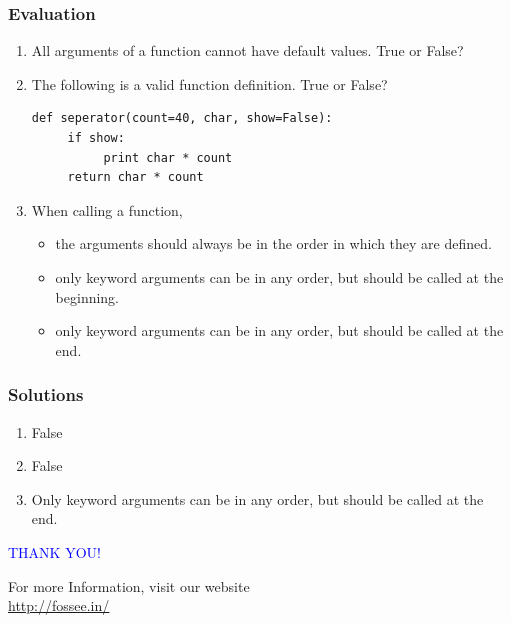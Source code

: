 \documentclass[presentation]{beamer}
\begin{document}
\begin{frame}[fragile]
\frametitle{Evaluation}
\label{sec-13}


\begin{enumerate}
\item All arguments of a function cannot have default values.
 True or False?
\vspace{3pt} 
\item The following is a valid function definition. True or False? 
\lstset{language=Python}
\begin{lstlisting}
def seperator(count=40, char, show=False):
     if show:
          print char * count
     return char * count
\end{lstlisting}
\vspace{3pt}
\item When calling a function,
\begin{itemize}
\item the arguments should always be in the order in which they are defined.
\item only keyword arguments can be in any order, but should be called
     at the beginning.
\item only keyword arguments can be in any order, but should be called at the end.
\end{itemize}
\end{enumerate}
\end{frame}
\begin{frame}
\frametitle{Solutions}
\label{sec-14}


\begin{enumerate}
\item False
\vspace{12pt}
\item False
\vspace{12pt}
\item Only keyword arguments can be in any order, 
   but should be called at the end.
\end{enumerate}
\end{frame}
\begin{frame}

  \begin{block}{}
  \begin{center}
  \textcolor{blue}{\Large THANK YOU!} 
  \end{center}
  \end{block}
\begin{block}{}
  \begin{center}
    For more Information, visit our website\\
    \url{http://fossee.in/}
  \end{center}  
  \end{block}
\end{frame}
\end{document}
